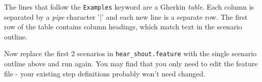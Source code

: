     The lines that follow the \texttt{Examples} keyword are a Gherkin \emph{table}. Each column is separated by a \emph{pipe} character '|' and each new line is a separate row. The first row of the table contains column headings, which match text in the scenario outline.
    
    Now replace the first 2 scenarios in \texttt{hear_shout.feature} with the single scenario outline above and run \CUKE{} again. You may find that you only need to edit the feature file - your existing step definitions probably won't need changed.
    
    
\fi